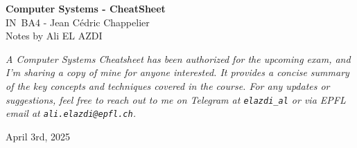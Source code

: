 \documentclass[8pt]{extarticle}
\begin{document}
\begin{titlepage}
    \centering
    \vspace*{1cm}
    {\fontsize{30}{36}\selectfont \textbf{Computer Systems - CheatSheet}} \\
    \vspace{10px}
    {\fontsize{15}{30}\selectfont IN~BA4 - Jean Cédric Chappelier} \\
    \vspace*{10px}
    {\fontsize{15}{20}\selectfont Notes by Ali EL AZDI} \\
    \vfill

    \begin{justify}
        \textit{\large A Computer Systems Cheatsheet has been authorized for the upcoming exam, and I'm sharing a copy of mine for anyone interested. It provides a concise summary of the key concepts and techniques covered in the course. For any updates or suggestions, feel free to reach out to me on Telegram at \texttt{elazdi\_al} or via EPFL email at \texttt{ali.elazdi@epfl.ch}.}
    \end{justify}
    \vspace*{100px}

    {\Large April 3rd, 2025}
    \vspace*{50px}
\end{titlepage}
\vspace*{-10px}
\hspace*{-20px}
\end{document}

